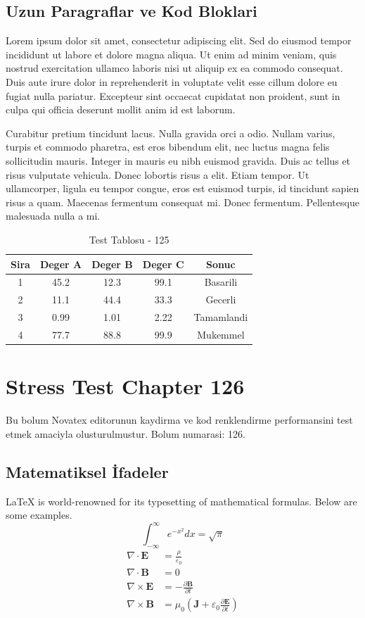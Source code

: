 \documentclass[12pt,a4paper]{article}
\begin{document}
\subsection{Uzun Paragraflar ve Kod Bloklari}
Lorem ipsum dolor sit amet, consectetur adipiscing elit. Sed do eiusmod tempor incididunt ut labore et dolore magna aliqua. Ut enim ad minim veniam, quis nostrud exercitation ullamco laboris nisi ut aliquip ex ea commodo consequat. Duis aute irure dolor in reprehenderit in voluptate velit esse cillum dolore eu fugiat nulla pariatur. Excepteur sint occaecat cupidatat non proident, sunt in culpa qui officia deserunt mollit anim id est laborum.

Curabitur pretium tincidunt lacus. Nulla gravida orci a odio. Nullam varius, turpis et commodo pharetra, est eros bibendum elit, nec luctus magna felis sollicitudin mauris. Integer in mauris eu nibh euismod gravida. Duis ac tellus et risus vulputate vehicula. Donec lobortis risus a elit. Etiam tempor. Ut ullamcorper, ligula eu tempor congue, eros est euismod turpis, id tincidunt sapien risus a quam. Maecenas fermentum consequat mi. Donec fermentum. Pellentesque malesuada nulla a mi.

\begin{table}[h!]
\centering
\begin{tabular}{|c|c|c|c|c|}
\hline
\textbf{Sira} & \textbf{Deger A} & \textbf{Deger B} & \textbf{Deger C} & \textbf{Sonuc} \\
\hline
1 & 45.2 & 12.3 & 99.1 & Basarili \\
2 & 11.1 & 44.4 & 33.3 & Gecerli \\
3 & 0.99 & 1.01 & 2.22 & Tamamlandi \\
4 & 77.7 & 88.8 & 99.9 & Mukemmel \\
\hline
\end{tabular}
\caption{Test Tablosu - 125}
\end{table}

\newpage
\section{Stress Test Chapter 126}
Bu bolum Novatex editorunun kaydirma ve kod renklendirme performansini test etmek amaciyla olusturulmustur. Bolum numarasi: 126.

\subsection{Matematiksel İfadeler}
\LaTeX{} is world-renowned for its typesetting of mathematical formulas. Below are some examples.
\begin{equation}
\int_{-\infty}^{\infty} e^{-x^2} dx = \sqrt{\pi}
\end{equation}
\begin{align}
\nabla \cdot \mathbf{E} &= \frac{\rho}{\varepsilon_0} \\
\nabla \cdot \mathbf{B} &= 0 \\
\nabla \times \mathbf{E} &= -\frac{\partial \mathbf{B}}{\partial t} \\
\nabla \times \mathbf{B} &= \mu_0\left(\mathbf{J} + \varepsilon_0 \frac{\partial \mathbf{E}}{\partial t}\right)
\end{align}
\end{document}
